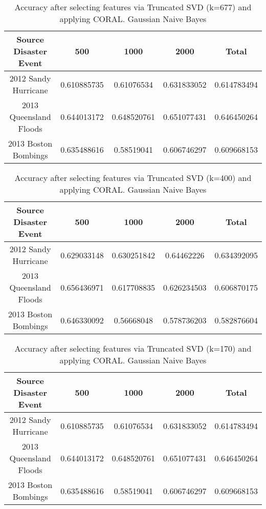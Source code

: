 \begin{table}[ht]
    \begin{center}
    \caption{Accuracy after selecting features via Truncated SVD (k=677) and applying CORAL. Gaussian Naive Bayes}
    \begin{tabular}[c]{|c|c|c|c|c|}
        \hline
        Source Disaster Event & 500 & 1000 & 2000 & Total \\
        \hline
        2012 Sandy Hurricane & 0.610885735 & 0.61076534 & 0.631833052 & 0.614783494 \\
        2013 Queensland Floods & 0.644013172 & 0.648520761 & 0.651077431 & 0.646450264 \\
        2013 Boston Bombings & 0.635488616 & 0.58519041 & 0.606746297 & 0.609668153 \\
        \hline
    \end{tabular}
    \label{tabletrunsvd677}
   \end{center}
\end{table}

\begin{table}[ht]
    \begin{center}
    \caption{Accuracy after selecting features via Truncated SVD (k=400) and applying CORAL. Gaussian Naive Bayes}
    \begin{tabular}[c]{|c|c|c|c|c|}
        \hline
        Source Disaster Event & 500 & 1000 & 2000 & Total \\
        \hline
        2012 Sandy Hurricane & 0.629033148 & 0.630251842 & 0.64462226 & 0.634392095 \\
        2013 Queensland Floods & 0.656436971 & 0.617708835 & 0.626234503 & 0.606870175 \\
        2013 Boston Bombings & 0.646330092 & 0.56668048 & 0.578736203 & 0.582876604 \\
        \hline
    \end{tabular}
    \label{tabletrunsvd400}
   \end{center}
\end{table}

\begin{table}[ht]
    \begin{center}
    \caption{Accuracy after selecting features via Truncated SVD (k=170) and applying CORAL. Gaussian Naive Bayes}
    \begin{tabular}[c]{|c|c|c|c|c|}
        \hline
        Source Disaster Event & 500 & 1000 & 2000 & Total \\
        \hline
        2012 Sandy Hurricane & 0.610885735 & 0.61076534 & 0.631833052 & 0.614783494 \\
        2013 Queensland Floods & 0.644013172 & 0.648520761 & 0.651077431 & 0.646450264 \\
        2013 Boston Bombings & 0.635488616 & 0.58519041 & 0.606746297 & 0.609668153 \\
        \hline
    \end{tabular}
    \label{tabletrunsvd170}
   \end{center}
\end{table}


